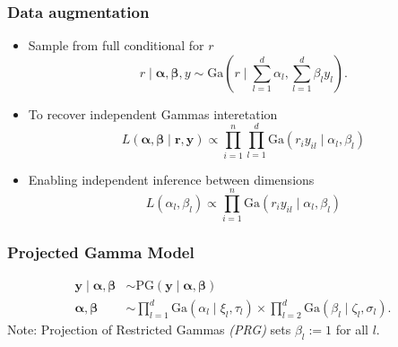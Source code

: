\documentclass[aspectratio=169]{beamer}
\begin{document}
\begin{frame}
  \frametitle{Data augmentation}
  \begin{itemize}
    \item Sample from full conditional for $r$
      \begin{equation*}
        r\mid\bm{ \alpha},\bm{ \beta}, y \sim \text{Ga}\left(r\mid{\textstyle\sum}_{l = 1}^d \alpha_l,
              {\textstyle\sum}_{l = 1}^d \beta_ly_l\right).
      \end{equation*}
    \pause
    \item To recover independent Gammas interetation
      \begin{equation*}
        L(\bm{\alpha},\bm{\beta} \mid \bm{r},\bm{y}) \propto
            \prod_{i = 1}^n\prod_{l = 1}^{d}\text{Ga}\left(r_iy_{il}\mid\alpha_l,\beta_l\right)
      \end{equation*}
    \pause
    \item Enabling independent inference between dimensions
      \begin{equation*}
        L(\alpha_l,\beta_l) \propto \prod_{i = 1}^n
                  \text{Ga}\left(r_iy_{il}\mid\alpha_l,\beta_l\right)
      \end{equation*}
  \end{itemize}
\end{frame} %
\begin{frame}
  \frametitle{Projected Gamma Model}
  \begin{equation*}
    \begin{aligned}
      \bm{ y}\mid\bm{\alpha},\bm{\beta} &\sim \text{PG}(\bm{ y}\mid\bm{\alpha},\bm{\beta})\\
      \bm{ \alpha},\bm{\beta} &\sim {\textstyle \prod}_{l = 1}^d \text{Ga}(\alpha_l \mid \xi_l,\tau_l)
              \times {\textstyle \prod}_{l = 2}^d \text{Ga}(\beta_l\mid \zeta_l,\sigma_l).
    \end{aligned}
  \end{equation*}
  \vfill
  {\small Note: Projection of Restricted Gammas \emph{(PRG)} sets $\beta_l := 1$ for all $l$.}
\end{frame} %
\end{document}
